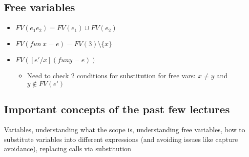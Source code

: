 \documentclass[11pt]{article}
\begin{document}
\subsection{Free variables}
\label{sec:org343845f}
\begin{itemize}
\item \(FV(e_1 e_2) = FV(e_1) \cup FV(e_2)\)
\item \(FV(fun \ x = e) = FV(3) \setminus \{x\}\)
\item \(FV([e'/x] (fun y = e))\)
\begin{itemize}
\item Need to check 2 conditions for substitution for free vars: \(x \neq y\) and \(y \notin FV(e')\)
\end{itemize}
\end{itemize}
\subsection{Important concepts of the past few lectures}
\label{sec:org79cfb24}
Variables, understanding what the scope is, understanding free variables, how to substitute variables into different expressions (and avoiding issues like capture avoidance), replacing calls via substitution
\end{document}
